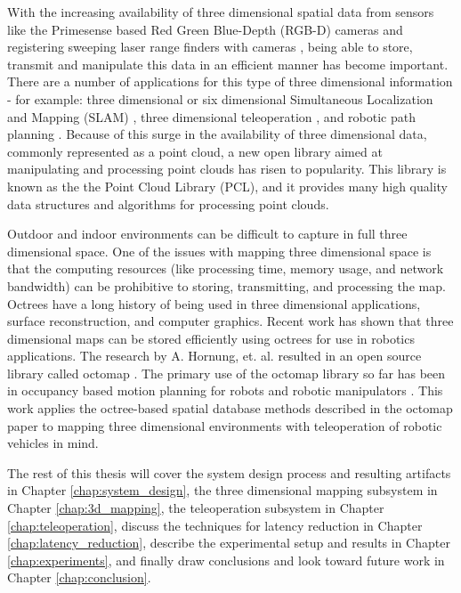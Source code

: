 \documentclass[12pt]{report}
\begin{document}
With the increasing availability of three dimensional spatial data from sensors like the Primesense based Red Green Blue-Depth (RGB-D) cameras \cite{PRIMESENSE} and registering sweeping laser range finders with cameras \cite{photo_real}, being able to store, transmit and manipulate this data in an efficient manner has become important.  There are a number of applications for this type of three dimensional information - for example: three dimensional or six dimensional Simultaneous Localization and Mapping (SLAM) \cite{biswasdepth}, three dimensional teleoperation \cite{photo_real}, and robotic path planning \cite{3DCOLLISION}.  Because of this surge in the availability of three dimensional data, commonly represented as a point cloud, a new open library aimed at manipulating and processing point clouds has risen to popularity.  This library is known as the the Point Cloud Library (PCL)\cite{rusu20113d}, and it provides many high quality data structures and algorithms for processing point clouds.
  
Outdoor and indoor environments can be difficult to capture in full three dimensional space. One of the issues with mapping three dimensional space is that the computing resources (like processing time, memory usage, and network bandwidth) can be prohibitive to storing, transmitting, and processing the map. Octrees have a long history of being used in three dimensional applications\cite{boada2001multiresolution}, surface reconstruction\cite{kazhdan2006poisson}, and computer graphics\cite{fang1996deformable}. Recent work has shown that three dimensional maps can be stored efficiently using octrees for use in robotics applications\cite{octomap}. The research by A. Hornung, et. al. resulted in an open source library called octomap \cite{octomap}. The primary use of the octomap library so far has been in occupancy based motion planning for robots and robotic manipulators \cite{3DCOLLISION}. This work applies the octree-based spatial database methods described in the octomap paper to mapping three dimensional environments with teleoperation of robotic vehicles in mind.


The rest of this thesis will cover the system design process and resulting artifacts in Chapter \ref{chap:system_design}, the three dimensional mapping subsystem in Chapter \ref{chap:3d_mapping}, the teleoperation subsystem in Chapter \ref{chap:teleoperation}, discuss the techniques for latency reduction in Chapter \ref{chap:latency_reduction}, describe the experimental setup and results in Chapter \ref{chap:experiments}, and finally draw conclusions and look toward future work in Chapter \ref{chap:conclusion}.
\end{document}

